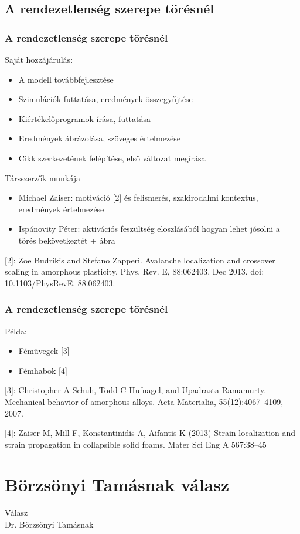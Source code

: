 \documentclass[12pt]{beamer}
\begin{document}
\subsection{A rendezetlenség szerepe törésnél}
\begin{frame}
\frametitle{A rendezetlenség szerepe törésnél}
Saját hozzájárulás:
\begin{itemize}
\item A modell továbbfejlesztése
\item Szimulációk futtatása, eredmények összegyűjtése
\item Kiértékelőprogramok írása, futtatása
\item Eredmények ábrázolása, szöveges értelmezése
\item Cikk szerkezetének felépítése, első változat megírása
\end{itemize}
Társszerzők munkája
\begin{itemize}
\item Michael Zaiser: motiváció [2] és felismerés, szakirodalmi kontextus, eredmények értelmezése
\item Ispánovity Péter: aktivációs feszültség eloszlásából hogyan lehet jósolni a törés bekövetkeztét + ábra
\end{itemize}
[2]: Zoe Budrikis and Stefano Zapperi. Avalanche localization and crossover scaling in
amorphous plasticity. Phys. Rev. E, 88:062403, Dec 2013. doi: 10.1103/PhysRevE.
88.062403.
\end{frame}

\begin{frame}
\frametitle{A rendezetlenség szerepe törésnél}
Példa:
\begin{itemize}
\item Fémüvegek [3]
\item Fémhabok [4]
\end{itemize}
[3]: Christopher A Schuh, Todd C Hufnagel, and Upadrasta Ramamurty. Mechanical behavior of amorphous alloys. Acta Materialia, 55(12):4067–4109, 2007.

[4]: Zaiser M, Mill F, Konstantinidis A, Aifantis K (2013) Strain localization and strain propagation in collapsible solid foams. Mater Sci Eng A 567:38–45

\end{frame}

\section{Börzsönyi Tamásnak válasz}
\begin{frame}
\centering
\huge Válasz\\
\large Dr. Börzsönyi Tamásnak
\end{frame}
\end{document}
